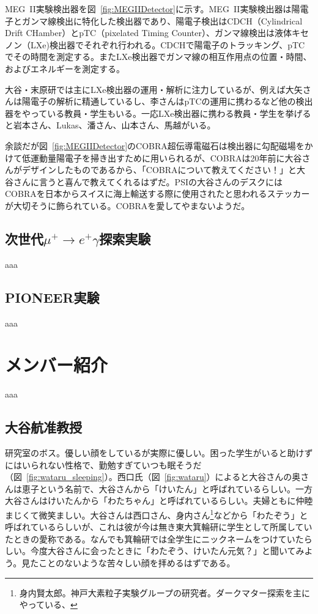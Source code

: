 MEG~II実験検出器を図~\ref{fig:MEGIIDetector}に示す。MEG~II実験検出器は陽電子とガンマ線検出に特化した検出器であり、陽電子検出はCDCH（Cylindrical Drift CHamber）とpTC（pixelated Timing Counter）、ガンマ線検出は液体キセノン（LXe)検出器でそれぞれ行われる。CDCHで陽電子のトラッキング、pTCでその時間を測定する。またLXe検出器でガンマ線の相互作用点の位置・時間、およびエネルギーを測定する。

  大谷・末原研では主にLXe検出器の運用・解析に注力しているが、例えば大矢さんは陽電子の解析に精通しているし、李さんはpTCの運用に携わるなど他の検出器をやっている教員・学生もいる。一応LXe検出器に携わる教員・学生を挙げると岩本さん、Lukas、潘さん、山本さん、馬越がいる。

  余談だが図~\ref{fig:MEGIIDetector}のCOBRA超伝導電磁石は検出器に勾配磁場をかけて低運動量陽電子を掃き出すために用いられるが、COBRAは20年前に大谷さんがデザインしたものであるから、「COBRAについて教えてください！」と大谷さんに言うと喜んで教えてくれるはずだ。PSIの大谷さんのデスクにはCOBRAを日本からスイスに海上輸送する際に使用されたと思われるステッカーが大切そうに飾られている。COBRAを愛してやまないようだ。

\subsection{次世代$\mu^{+}\rightarrow e^{+}\gamma$探索実験}
aaa

\subsection{PIONEER実験}
aaa

\section{メンバー紹介}
aaa

\subsection{大谷航准教授}
研究室のボス。優しい顔をしているが実際に優しい。困った学生がいると助けずにはいられない性格で、勤勉すぎていつも眠そうだ（図~\ref{fig:wataru_sleeping}）。西口氏（図~\ref{fig:wataru}）によると大谷さんの奥さんは恵子という名前で、大谷さんから「けいたん」と呼ばれているらしい。一方大谷さんはけいたんから「わたちゃん」と呼ばれているらしい。夫婦ともに仲睦まじくて微笑ましい。大谷さんは西口さん、身内さん\footnote{
身内賢太郎。神戸大素粒子実験グループの研究者。ダークマター探索を主にやっている、
}などから「わたぞう」と呼ばれているらしいが、これは彼が今は無き東大箕輪研に学生として所属していたときの愛称である。なんでも箕輪研では全学生にニックネームをつけていたらしい。今度大谷さんに会ったときに「わたぞう、けいたん元気？」と聞いてみよう。見たことのないような苦々しい顔を拝めるはずである。


